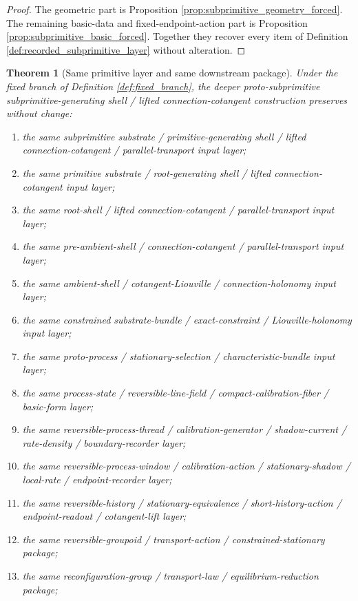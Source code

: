 \documentclass[11pt]{article}
\newtheorem{theorem}{Theorem}
\begin{document}
\begin{proof}
The geometric part is Proposition \ref{prop:subprimitive_geometry_forced}. The remaining basic-data and fixed-endpoint-action part is Proposition \ref{prop:subprimitive_basic_forced}. Together they recover every item of Definition \ref{def:recorded_subprimitive_layer} without alteration.
\end{proof}

\begin{theorem}[Same primitive layer and same downstream package]
\label{thm:same_package}
Under the fixed branch of Definition \ref{def:fixed_branch}, the deeper proto-subprimitive subprimitive-generating shell / lifted connection-cotangent construction preserves without change:
\begin{enumerate}
    \item the same subprimitive substrate / primitive-generating shell / lifted connection-cotangent / parallel-transport input layer;
    \item the same primitive substrate / root-generating shell / lifted connection-cotangent input layer;
    \item the same root-shell / lifted connection-cotangent / parallel-transport input layer;
    \item the same pre-ambient-shell / connection-cotangent / parallel-transport input layer;
    \item the same ambient-shell / cotangent-Liouville / connection-holonomy input layer;
    \item the same constrained substrate-bundle / exact-constraint / Liouville-holonomy input layer;
    \item the same proto-process / stationary-selection / characteristic-bundle input layer;
    \item the same process-state / reversible-line-field / compact-calibration-fiber / basic-form layer;
    \item the same reversible-process-thread / calibration-generator / shadow-current / rate-density / boundary-recorder layer;
    \item the same reversible-process-window / calibration-action / stationary-shadow / local-rate / endpoint-recorder layer;
    \item the same reversible-history / stationary-equivalence / short-history-action / endpoint-readout / cotangent-lift layer;
    \item the same reversible-groupoid / transport-action / constrained-stationary package;
    \item the same reconfiguration-group / transport-law / equilibrium-reduction package;

\end{enumerate}
\end{theorem}
\end{document}
